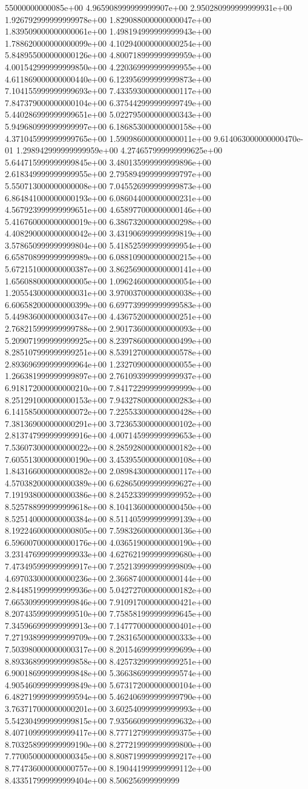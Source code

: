 55000000000085e+00	4.965908999999999907e+00	2.950280999999999931e+00	1.926792999999999978e+00	1.829088000000000047e+00	1.839509000000000061e+00	1.498194999999999943e+00	1.788620000000000099e+00	4.102940000000000254e+00	5.848955000000000126e+00	4.800718999999999959e+00	4.001542999999999850e+00	4.220369999999999955e+00	4.611869000000000440e+00	6.123956999999999873e+00	7.104155999999999693e+00	7.433593000000000117e+00	7.847379000000000104e+00	6.375442999999999749e+00	5.440286999999999651e+00	5.022795000000000343e+00	5.949680999999999997e+00	6.186853000000000158e+00	4.371045999999999765e+00	1.590986000000000011e+00	9.614063000000000470e-01	1.298942999999999959e+00	4.274657999999999625e+00	5.644715999999999845e+00	3.480135999999999896e+00	2.618349999999999955e+00	2.795894999999999797e+00	5.550713000000000008e+00	7.045526999999999873e+00	6.864841000000000193e+00	6.086044000000000231e+00	4.567923999999999651e+00	4.658977000000000146e+00	5.416760000000000019e+00	6.386732000000000298e+00	4.408290000000000042e+00	3.431906999999999819e+00	3.578650999999999804e+00	5.418525999999999954e+00	6.658708999999999989e+00	6.088109000000000215e+00	5.672151000000000387e+00	3.862569000000000141e+00	1.656088000000000005e+00	1.096246000000000054e+00	1.205543000000000031e+00	3.970037000000000038e+00	6.606582000000000399e+00	6.697739999999999583e+00	5.449836000000000347e+00	4.436752000000000251e+00	2.768215999999999788e+00	2.901736000000000093e+00	5.209071999999999925e+00	8.239786000000000499e+00	8.285107999999999251e+00	8.539127000000000578e+00	2.893696999999999964e+00	1.232709000000000055e+00	1.266381999999999897e+00	2.761093999999999937e+00	6.918172000000000210e+00	7.841722999999999999e+00	8.251291000000000153e+00	7.943278000000000283e+00	6.141585000000000072e+00	7.225533000000000428e+00	7.381369000000000291e+00	3.723653000000000102e+00	2.813747999999999916e+00	4.007145999999999653e+00	7.536073000000000022e+00	8.285928000000000182e+00	7.605513000000000190e+00	3.453955000000000108e+00	1.843166000000000082e+00	2.089843000000000117e+00	4.570382000000000389e+00	6.628650999999999627e+00	7.191938000000000386e+00	8.245233999999999952e+00	8.525788999999999618e+00	8.104136000000000450e+00	8.525140000000000384e+00	8.511405999999999139e+00	8.192246000000000805e+00	7.598326000000000136e+00	6.596007000000000176e+00	4.036519000000000190e+00	3.231476999999999933e+00	4.627621999999999680e+00	7.473495999999999917e+00	7.252139999999999809e+00	4.697033000000000236e+00	2.366874000000000144e+00	2.844851999999999936e+00	5.042727000000000182e+00	7.665309999999999846e+00	7.910917000000000421e+00	8.207435999999999510e+00	7.758581999999999645e+00	7.345966999999999913e+00	7.147770000000000401e+00	7.271938999999999709e+00	7.283165000000000333e+00	7.503980000000000317e+00	8.201546999999999699e+00	8.893368999999999858e+00	8.425732999999999251e+00	6.900186999999999848e+00	5.366386999999999574e+00	4.905460999999999849e+00	5.673172000000000104e+00	6.482719999999999594e+00	5.462406999999999790e+00	3.763717000000000201e+00	3.602540999999999993e+00	5.542304999999999815e+00	7.935660999999999632e+00	8.407109999999999417e+00	8.777127999999999375e+00	8.703258999999999190e+00	8.277219999999999800e+00	7.770050000000000345e+00	8.808719999999999217e+00	8.774736000000000757e+00	8.190441999999999112e+00	8.433517999999999404e+00	8.506256999999999